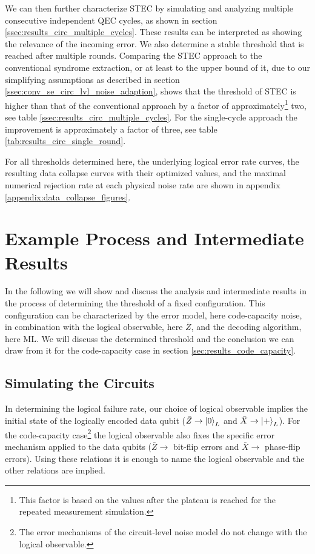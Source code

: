 We can then further characterize STEC by simulating and analyzing multiple consecutive independent QEC cycles, as shown in section \ref{ssec:results_circ_multiple_cycles}.
These results can be interpreted as showing the relevance of the incoming error. 
We also determine a stable threshold that is reached after multiple rounds.
Comparing the STEC approach to the conventional syndrome extraction, or at least to the upper bound of it, due to our simplifying assumptions as described in section \ref{ssec:conv_se_circ_lvl_noise_adaption}, 
shows that the threshold of STEC is higher than that of the conventional approach by a factor of approximately\footnote{
    This factor is based on the values after the plateau is reached for the repeated measurement simulation. 
} two, see table \ref{ssec:results_circ_multiple_cycles}.
For the single-cycle approach the improvement is approximately a factor of three, see table \ref{tab:results_circ_single_round}.


For all thresholds determined here, the underlying logical error rate curves, the resulting data collapse curves with their optimized values, 
and the maximal numerical rejection rate at each physical noise rate are shown in appendix \ref{appendix:data_collapse_figures}.


\section{Example Process and Intermediate Results}\label{ssec:results_example_process}

In the following we will show and discuss the analysis and intermediate results in the process of determining the threshold of a fixed configuration.
This configuration can be characterized by the error model, here code-capacity noise, in combination with the logical observable, here $\bar{Z}$, and the decoding algorithm, here ML.
We will discuss the determined threshold and the conclusion we can draw from it for the code-capacity case in section \ref{sec:results_code_capacity}.

\subsection{Simulating the Circuits}

In determining the logical failure rate, our choice of logical observable implies the initial state of the logically encoded data qubit
($\bar{Z} \rightarrow \ket{0}_L$ and $\bar{X} \rightarrow \ket{+}_L$).
For the code-capacity case\footnote{
    The error mechanisms of the circuit-level noise model do not change with the logical observable.
} the logical observable also fixes the specific error mechanism applied to the data qubits ($\bar{Z} \rightarrow $ bit-flip errors and $\bar{X} \rightarrow $ phase-flip errors). 
Using these relations it is enough to name the logical observable and the other relations are implied.

